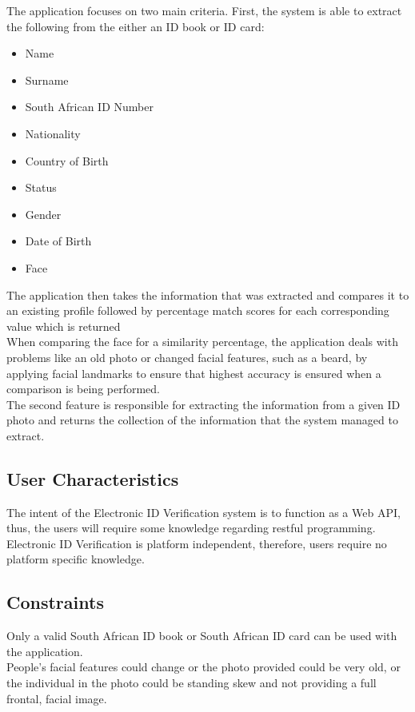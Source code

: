 \documentclass{article}
\def \project{Electronic ID Verification }
\begin{document}
		 \noindent The application focuses on two main criteria. First, the system is able to extract the following
		 from the either an ID book or ID card:
		 \begin{itemize}
			\item Name
			\item Surname
			\item South African ID Number
			\item Nationality
			\item Country of Birth
			\item Status
			\item Gender
			\item Date of Birth
			\item Face
		 \end{itemize}
The application then takes the information that was extracted and compares it to an existing profile followed by percentage match scores for each corresponding value which is returned\\
		 
		  \noindent When comparing the face for a similarity percentage, the application deals with problems like an old photo or changed facial features, such as a beard, by applying facial landmarks to ensure that highest accuracy is ensured when a comparison is being performed.\\
		  
		  \noindent The second feature is responsible for extracting the information from a given ID photo and returns the collection of the information that the system managed to extract.

		\subsection{User Characteristics}\label{subsec:overall-user-characteristics}
		    The intent of the \project system is to function as a Web API, thus, the users will require some knowledge regarding restful programming. \project is platform independent, therefore, users require no platform specific knowledge.

		\subsection{Constraints}\label{subsec:overall-constraints}
			Only a valid South African ID book or South African ID card can be used with the application.\\
			
			\noindent People's facial features could change or the photo provided could be very old, or the individual in the photo could be standing skew and not providing a full frontal, facial image.\\
\end{document}
